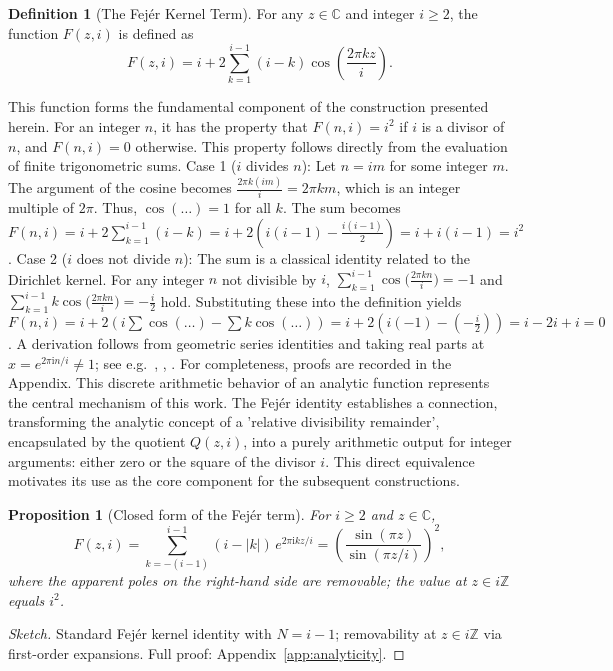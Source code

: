 \documentclass[11pt,a4paper]{amsart}
\newcommand{\C}{\mathbb{C}}
\newcommand{\Z}{\mathbb{Z}}
\newcommand{\ii}{\mathrm{i}}
\theoremstyle{plain}
\newtheorem{proposition}[theorem]{Proposition}
\theoremstyle{definition}
\newtheorem{definition}[theorem]{Definition}
\theoremstyle{remark}
\begin{document}
\begin{definition}[The Fej\'er Kernel Term]
For any $z \in \C$ and integer $i \ge 2$, the function $F(z,i)$ is defined as
\[F(z,i) = i+2\sum_{k=1}^{i-1}(i-k)\cos\left(\frac{2\pi k z}{i}\right).\]
\end{definition}
This function forms the fundamental component of the construction presented herein. For an integer $n$, it has the property that $F(n,i) = i^2$ if $i$ is a divisor of $n$, and $F(n,i) = 0$ otherwise. This property follows directly from the evaluation of finite trigonometric sums.
Case 1 ($i$ divides $n$): Let $n=im$ for some integer $m$. The argument of the cosine becomes $\frac{2\pi k (im)}{i} = 2\pi km$, which is an integer multiple of $2\pi$. Thus, $\cos(\dots)=1$ for all $k$. The sum becomes $F(n,i) = i + 2\sum_{k=1}^{i-1}(i-k) = i + 2\left(i(i-1) - \frac{i(i-1)}{2}\right) = i + i(i-1) = i^2$.
Case 2 ($i$ does not divide $n$): The sum is a classical identity related to the Dirichlet kernel. For any integer $n$ not divisible by $i$, $\sum_{k=1}^{i-1} \cos\!\bigl(\frac{2\pi kn}{i}\bigr) = -1$ and $\sum_{k=1}^{i-1} k \cos\!\bigl(\frac{2\pi kn}{i}\bigr) = -\frac{i}{2}$ hold. Substituting these into the definition yields $F(n,i) = i + 2\left(i\sum \cos(\dots) - \sum k\cos(\dots)\right) = i + 2(i(-1) - (-\frac{i}{2})) = i - 2i + i = 0$. A derivation follows from geometric series identities and taking real parts at $x=e^{2\pi \ii n/i}\neq 1$; see e.g.~\cite[Ch.~3]{davenport2000}, \cite[Ch.~I]{zygmund2002}, \cite[Ch.~I]{montgomeryvaughan2007}. For completeness, proofs are recorded in the Appendix.
This discrete arithmetic behavior of an analytic function represents the central mechanism of this work. The Fej\'er identity establishes a connection, transforming the analytic concept of a 'relative divisibility remainder', encapsulated by the quotient $Q(z,i)$, into a purely arithmetic output for integer arguments: either zero or the square of the divisor $i$. This direct equivalence motivates its use as the core component for the subsequent constructions.

\begin{proposition}[Closed form of the Fej\'er term]
\label{prop:fejer-closed}
For $i\ge2$ and $z\in\C$,
\[
F(z,i)=\sum_{k=-(i-1)}^{i-1}(i-|k|)\,e^{2\pi \ii k z/i}
=\left(\frac{\sin(\pi z)}{\sin(\pi z/i)}\right)^2,
\]
where the apparent poles on the right-hand side are removable; the value at $z\in i\Z$ equals $i^2$.
\end{proposition}
\begin{proof}[Sketch]
Standard Fej\'er kernel identity with $N=i-1$; removability at $z\in i\mathbb{Z}$ via first-order expansions.
Full proof: Appendix~\ref{app:analyticity}.
\end{proof}
\end{document}
